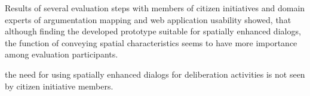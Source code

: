 
Results of several evaluation steps with members of citizen initiatives and domain experts of argumentation mapping and web application usability showed, that although finding the developed prototype suitable for spatially enhanced dialogs, the function of conveying spatial characteristics seems to have more importance among evaluation participants.


the need for using spatially enhanced dialogs for deliberation activities is not seen by citizen initiative members.